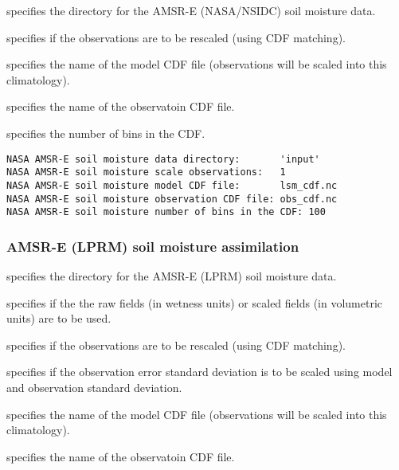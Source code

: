  
  specifies the directory
 for the AMSR-E (NASA/NSIDC) soil moisture data.

  specifies if the
 observations are to be rescaled (using CDF matching).

  specifies the
 name of the model CDF file (observations will be scaled into this
 climatology).

  specifies the
 name of the observatoin CDF file.

  specifies the
 number of bins in the CDF.
 

 \begin{Verbatim}[frame=single]
NASA AMSR-E soil moisture data directory:       'input'
NASA AMSR-E soil moisture scale observations:   1
NASA AMSR-E soil moisture model CDF file:       lsm_cdf.nc
NASA AMSR-E soil moisture observation CDF file: obs_cdf.nc
NASA AMSR-E soil moisture number of bins in the CDF: 100 
 \end{Verbatim}

 
 \subsubsection{AMSR-E (LPRM) soil moisture assimilation}
 \label{sssec:lprmamsreda}
 

 
  specifies the
 directory for the AMSR-E (LPRM) soil moisture data.

  specifies if the 
 the raw fields (in wetness units) or scaled fields
 (in volumetric units) are to be used.

  specifies if the
 observations are to be rescaled (using CDF matching).

  specifies if
 the observation error standard deviation is to be scaled using
 model and observation standard deviation.

  specifies the
 name of the model CDF file (observations will be scaled into this
 climatology).

  specifies the
 name of the observatoin CDF file.

